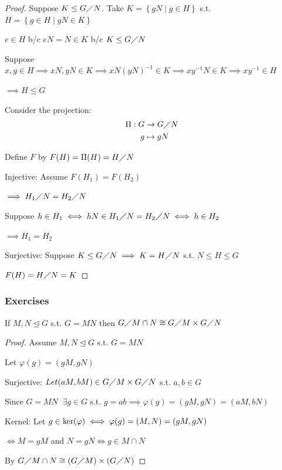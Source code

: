 \begin{proof}
    Suppose $K \leq G\diagup N$. Take $K=\left\{ gN \mid g \in H \right\}$ s.t. $H=\left\{ g \in H \mid gN \in K \right\}$

    $e \in H$ b/c $eN=N \in K$ b/c $K \leq G \diagup N$

    Suppose $x,y\in H \implies xN,yN \in K \implies xN(yN)^{-1}\in K
    \implies xy^{-1}N \in K \implies xy^{-1} \in H$ 
    
    $\implies H \leq G$ 

    Consider the projection:
    \begin{align*}
        \Pi: G &\rightarrow G \diagup N\\
             g &\mapsto gN
    \end{align*}

    Define $F$ by $F(H)=\Pi(H)=H\diagup N$

    Injective: Assume $F(H_1)=F(H_2)$

    $\implies H_1 \diagup N = H_2 \diagup N$

    Suppose $h\in H_1 \iff hN \in H_1 \diagup N = H_2 \diagup N \iff h \in H_2$

    $\implies H_1 = H_2$

    Surjective: Suppose $K \leq G \diagup N \implies K = H \diagup N$ s.t. $N \leq H \leq G$

    $F(H)=H \diagup N= K$
\end{proof}

\subsubsection{Exercises}

\begin{example}
    If $M,N \unlhd G$ s.t. $G=MN$ then $G\diagup M \cap N \cong G \diagup M \times G \diagup N$
\end{example}

\begin{proof}
    Assume $M,N \unlhd G$ s.t. $G=MN$

    Let $\varphi(g)=(gM,gN)$

    Surjective: $Let (aM,bM) \in G \diagup M \times G \diagup N$ s.t. $a,b\in G$

    Since $G=MN\;\; \exists g\in G$ s.t. $g=ab \implies
    \varphi(g)=(gM,gN)=(aM,bN)$

    Kernel: Let $g\in \text{ker}(\varphi) \iff \varphi(g)=(M,N)=(gM,gN)$

    $\iff M=gM$ and $N=gN \iff g\in M\cap N$

    By  $G\diagup M\cap N \cong (G \diagup M)\times(G \diagup N)$
\end{proof}